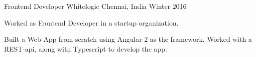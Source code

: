 

\begin{cventries}

  \cventry
    {Frontend Developer} %
    {Whitelogic} %
    {Chennai, India} %
    {Winter 2016} %
    {
      \begin{cvitems} %
      \item {Worked as Frontend Developer in a startup organization.}
        \item {Built a Web-App from scratch using Angular 2 as the framework.
            Worked with a REST-api, along with Typescript to develop the app.}
      \end{cvitems}
    }

\end{cventries}
